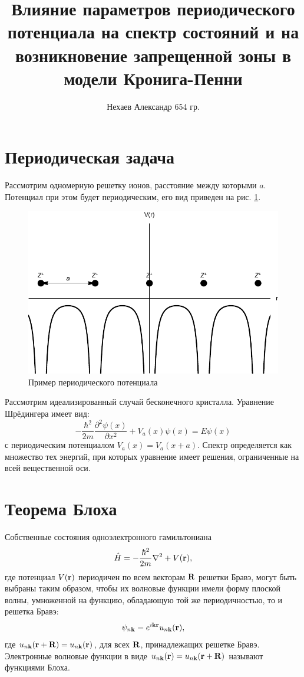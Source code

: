 \documentclass[a4paper, 12pt]{article}
\begin{document}
    \title{Влияние параметров периодического потенциала на спектр состояний и на возникновение запрещенной зоны в модели Кронига-Пенни}
    \author{Нехаев Александр 654 гр.}
    \maketitle
    \section{Периодическая задача}
    Рассмотрим одномерную решетку ионов, расстояние между которыми $a$. Потенциал при этом будет периодическим, его вид приведен на рис. \ref{fig:one}.
    \begin{figure}[h]
        \centering
        \includegraphics{fig1.pdf}
        \caption{Пример периодического потенциала}
        \label{fig:one}
    \end{figure}

    Рассмотрим идеализированный случай бесконечного кристалла. Уравнение Шрёдингера имеет вид:
    \begin{equation}
        -\frac{\hbar^2}{2m}\frac{\partial^2\psi(x)}{\partial x^2}+V_a(x)\psi(x)=E\psi(x)
    \end{equation}
    с периодическим потенциалом $V_a(x)=V_a(x+a)$. Спектр определяется как множество тех энергий, при которых уравнение имеет решения, ограниченные на всей вещественной оси.
    \section{Теорема Блоха}
    Собственные состояния одноэлектронного гамильтониана
    \begin{equation}
        \hat{H}=-\frac{\hbar^2}{2m}\nabla^2+V(\bf{r}),
    \end{equation}
    где потенциал $V(\bf{r})$ периодичен по всем векторам $\bf{R}$ решетки Бравэ, могут быть выбраны таким образом, чтобы их волновые функции имели форму плоской волны, умноженной на функцию, обладающую той же периодичностью, то и решетка Бравэ:
    \begin{equation}
        \psi_{n\bf{k}}=e^{i\bf{kr}}u_{n\bf{k}}(\bf{r}),
    \end{equation}
    где $u_{n\bf{k}}({\bf{r}+\bf{R}})=u_{n\bf{k}}(\bf{r})$, для всех $\bf{R}$, принадлежащих решетке Бравэ. Электронные волновые функции в виде $u_{n\bf{k}}({\bf{r}})=u_{n{\bf{k}}}(\bf{r+R})$ называют функциями Блоха.
\end{document}

